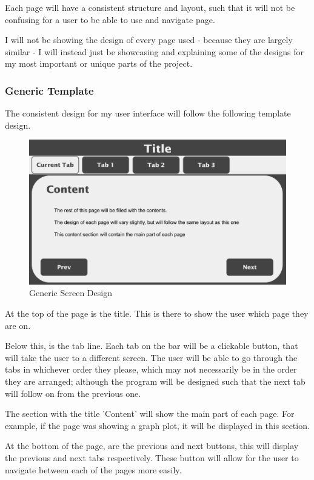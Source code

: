 \documentclass{article}
\begin{document}
Each page will have a consistent structure and layout, such that it will not be confusing for a user to be able to use and navigate page.

I will not be showing the design of every page used - because they are largely similar - I will instead just be showcasing and explaining some of the designs for my most important or unique parts of the project.

\subsubsection{Generic Template}
The consistent design for my user interface will follow the following template design.

\begin{figure}[ht]
    \centering
    \includegraphics[scale=0.3]{template-screen-design}
    \caption{Generic Screen Design}
\end{figure}

At the top of the page is the title. This is there to show the user which page they are on.

Below this, is the tab line. Each tab on the bar  will be a clickable button, that will take the user to a different screen. The user will be able to go through the tabs in whichever order they please, which may not necessarily be in the order they are arranged; although the program will be designed such that the next tab will follow on from the previous one.

The section with the title 'Content' will show the main part of each page. For example, if the page was showing a graph plot, it will be displayed in this section.

At the bottom of the page, are the previous and next buttons, this will display the previous and next tabs respectively. These button will allow for the user to navigate between each of the pages more easily.
\end{document}
